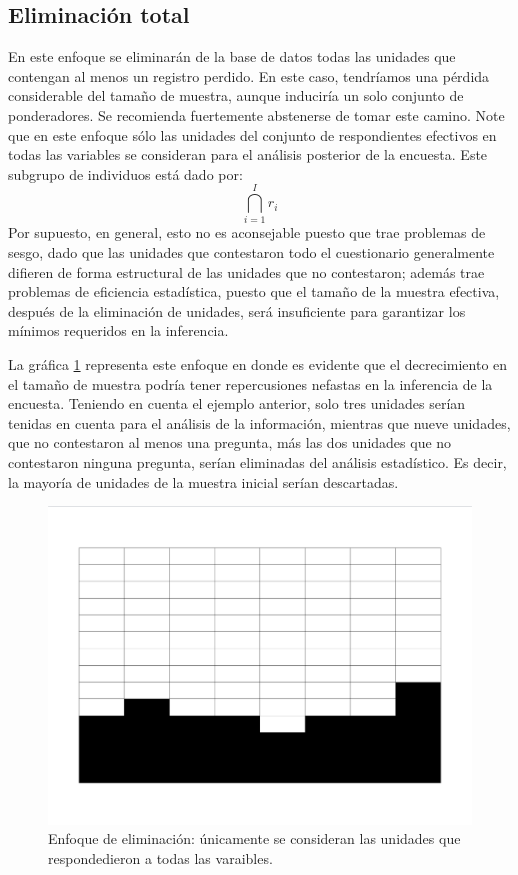 \documentclass[
  12pt,
  spanish,
]{book}
\begin{document}
\hypertarget{eliminaciuxf3n-total}{%
\subsection{Eliminación total}\label{eliminaciuxf3n-total}}

En este enfoque se eliminarán de la base de datos todas las unidades que contengan al menos un registro perdido. En este caso, tendríamos una pérdida considerable del tamaño de muestra, aunque induciría un solo conjunto de ponderadores. Se recomienda fuertemente abstenerse de tomar este camino. Note que en este enfoque sólo las unidades del conjunto de respondientes efectivos en todas las variables se consideran para el análisis posterior de la encuesta. Este subgrupo de individuos está dado por:
\[
\bigcap_{i=1}^I r_i
\]
Por supuesto, en general, esto no es aconsejable puesto que trae problemas de sesgo, dado que las unidades que contestaron todo el cuestionario generalmente difieren de forma estructural de las unidades que no contestaron; además trae problemas de eficiencia estadística, puesto que el tamaño de la muestra efectiva, después de la eliminación de unidades, será insuficiente para garantizar los mínimos requeridos en la inferencia.

La gráfica \ref{fig:figelimtotal} representa este enfoque en donde es evidente que el decrecimiento en el tamaño de muestra podría tener repercusiones nefastas en la inferencia de la encuesta. Teniendo en cuenta el ejemplo anterior, solo tres unidades serían tenidas en cuenta para el análisis de la información, mientras que nueve unidades, que no contestaron al menos una pregunta, más las dos unidades que no contestaron ninguna pregunta, serían eliminadas del análisis estadístico. Es decir, la mayoría de unidades de la muestra inicial serían descartadas.

\begin{figure}
\includegraphics[width=0.5\linewidth]{Pics/j4} \caption{Enfoque de eliminación: únicamente se consideran las unidades que respondedieron a todas las varaibles.}\label{fig:figelimtotal}
\end{figure}
\end{document}
